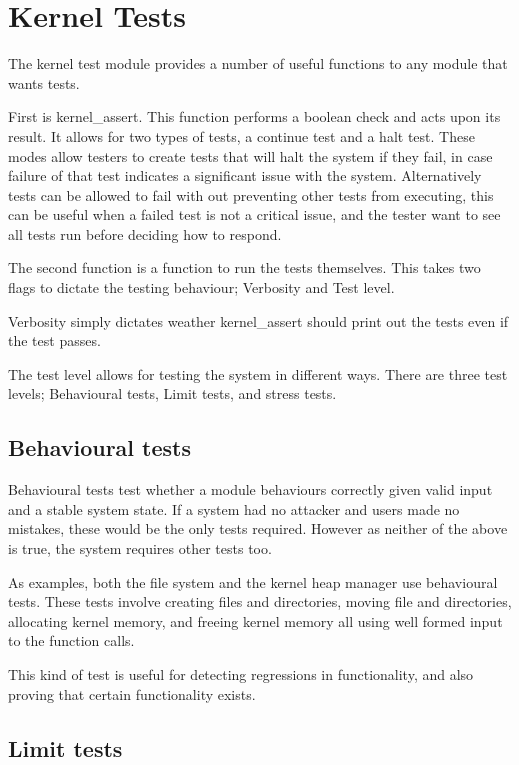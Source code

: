 \documentclass[a4paper]{report}
\begin{document}
\section{Kernel Tests}

The kernel test module provides a number of useful functions to any module that wants tests.

First is kernel\_assert. This function performs a boolean check and acts upon its result. It allows for two types of tests, a continue test and a halt test. These modes allow testers to create tests that will halt the system if they fail, in case failure of that test indicates a significant issue with the system. Alternatively tests can be allowed to fail with out preventing other tests from executing, this can be useful when a failed test is not a critical issue, and the tester want to see all tests run before deciding how to respond.

The second function is a function to run the tests themselves. This takes two flags to dictate the testing behaviour; Verbosity and Test level.

Verbosity simply dictates weather kernel\_assert should print out the tests even if the test passes.

The test level allows for testing the system in different ways. There are three test levels; Behavioural tests, Limit tests, and stress tests.

\subsection{Behavioural tests}

Behavioural tests test whether a module behaviours correctly given valid input and a stable system state. If a system had no attacker and users made no mistakes, these would be the only tests required. However as neither of the above is true, the system requires other tests too.

As examples, both the file system and the kernel heap manager use behavioural tests. These tests involve creating files and directories, moving file and directories, allocating kernel memory, and freeing kernel memory all using well formed input to the function calls.

This kind of test is useful for detecting regressions in functionality, and also proving that certain functionality exists.

\subsection{Limit tests}
\end{document}
